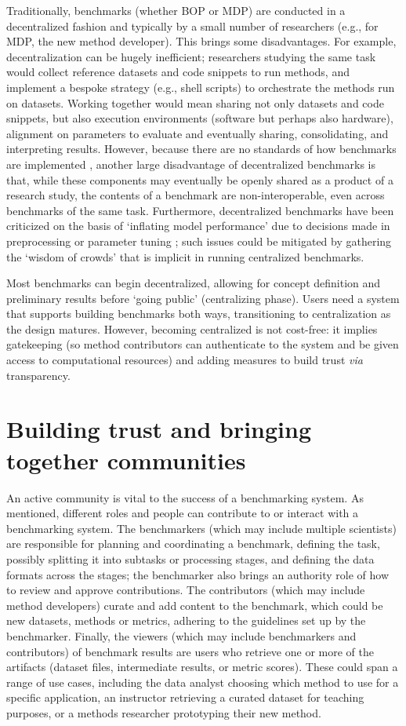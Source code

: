 \documentclass[11pt]{article}
\begin{document}
Traditionally, benchmarks (whether BOP or MDP) are conducted in a decentralized fashion and typically by a small number of researchers (e.g., for MDP, the new method developer). This brings some disadvantages. For example, decentralization can be hugely inefficient; researchers studying the same task would collect reference datasets and code snippets to run methods, and implement a bespoke strategy (e.g., shell scripts) to orchestrate the methods run on datasets. Working together would mean sharing not only datasets and code snippets, but also execution environments (software but perhaps also hardware), alignment on parameters to evaluate and eventually sharing, consolidating, and interpreting results. However, because there are no standards of how benchmarks are implemented \cite{Sonrel2023-te}, another large disadvantage of decentralized benchmarks is that, while these components may eventually be openly shared as a product of a research study, the contents of a benchmark are non-interoperable, even across benchmarks of the same task. Furthermore, decentralized benchmarks have been criticized on the basis of `inflating model performance' due to decisions made in preprocessing or parameter tuning \cite{Luecken2024-fk}; such issues could be mitigated by gathering the `wisdom of crowds' that is implicit in running centralized benchmarks.

Most benchmarks can begin decentralized, allowing for concept definition and preliminary results before `going public' (centralizing phase). Users need a system that supports building benchmarks both ways, transitioning to centralization as the design matures. However, becoming centralized is not cost-free: it implies gatekeeping (so method contributors can authenticate to the system and be given access to computational resources) and adding measures to build trust \textit{via} transparency.

\section*{Building trust and bringing together communities}

An active community is vital to the success of a benchmarking system. As mentioned, different roles and people can contribute to or interact with a benchmarking system. The benchmarkers (which may include multiple scientists) are responsible for planning and coordinating a benchmark, defining the task, possibly splitting it into subtasks or processing stages, and defining the data formats across the stages; the benchmarker also brings an authority role of how to review and approve contributions. The contributors (which may include method developers) curate and add content to the benchmark, which could be new datasets, methods or metrics, adhering to the guidelines set up by the benchmarker. Finally, the viewers (which may include benchmarkers and contributors) of benchmark results are users who retrieve one or more of the artifacts (dataset files, intermediate results, or metric scores). These could span a range of use cases, including the data analyst choosing which method to use for a specific application, an instructor retrieving a curated dataset for teaching purposes, or a methods researcher prototyping their new method.
\end{document}

